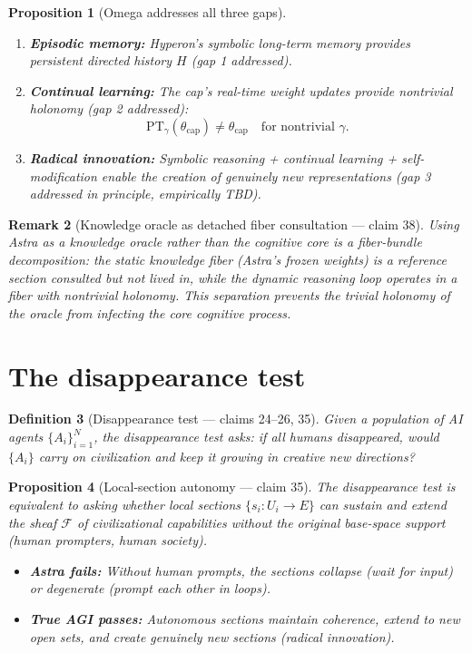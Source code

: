 \documentclass[11pt,a4paper]{article}
\newtheorem{definition}{Definition}[section]
\newtheorem{proposition}[definition]{Proposition}
\newtheorem{remark}[definition]{Remark}
\begin{document}
\begin{proposition}[Omega addresses all three gaps]
\label{prop:omega-addresses}
\begin{enumerate}
\item \textbf{Episodic memory:} Hyperon's symbolic long-term memory
  provides persistent directed history $H$ (gap 1 addressed).
\item \textbf{Continual learning:} The cap's real-time weight updates
  provide nontrivial holonomy (gap 2 addressed):
  \[
    \text{PT}_\gamma(\theta_{\text{cap}}) \neq \theta_{\text{cap}}
    \quad \text{for nontrivial } \gamma.
  \]
\item \textbf{Radical innovation:} Symbolic reasoning + continual learning
  + self-modification enable the creation of genuinely new representations
  (gap 3 addressed in principle, empirically TBD).
\end{enumerate}
\end{proposition}

\begin{remark}[Knowledge oracle as detached fiber consultation --- claim 38]
Using Astra as a knowledge oracle rather than the cognitive core is a
fiber-bundle decomposition: the static knowledge fiber (Astra's frozen
weights) is a reference section consulted but not lived in, while the
dynamic reasoning loop operates in a fiber with nontrivial holonomy.
This separation prevents the trivial holonomy of the oracle from infecting
the core cognitive process.
\end{remark}

\section{The disappearance test}
\label{sec:disappearance}

\begin{definition}[Disappearance test --- claims 24--26, 35]
\label{def:disappearance}
Given a population of AI agents $\{A_i\}_{i=1}^N$, the
\emph{disappearance test} asks: if all humans disappeared, would
$\{A_i\}$ carry on civilization and keep it growing in creative new
directions?
\end{definition}

\begin{proposition}[Local-section autonomy --- claim 35]
\label{prop:autonomy}
The disappearance test is equivalent to asking whether local sections
$\{s_i : U_i \to E\}$ can sustain and extend the sheaf $\mathcal{F}$
of civilizational capabilities without the original base-space support
(human prompters, human society).
\begin{itemize}
\item \textbf{Astra fails:} Without human prompts, the sections collapse
  (wait for input) or degenerate (prompt each other in loops).
\item \textbf{True AGI passes:} Autonomous sections maintain coherence,
  extend to new open sets, and create genuinely new sections
  (radical innovation).
\end{itemize}
\end{proposition}
\end{document}
